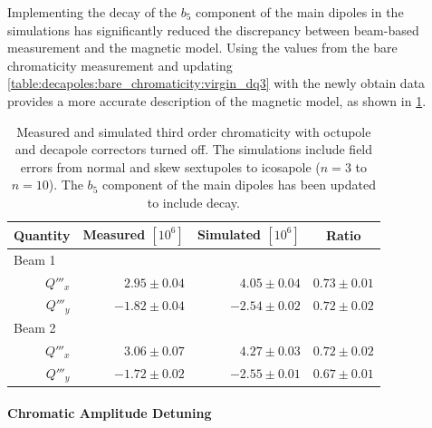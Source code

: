 Implementing the decay of the $b_5$ component of the main dipoles in the simulations has
significantly reduced the discrepancy between beam-based measurement and the magnetic model.
%
Using the values from the bare chromaticity measurement and updating
\cref{table:decapoles:bare_chromaticity:virgin_dq3} with the newly obtain data provides a more
accurate description of the magnetic model, as shown in
\cref{table:decapoles:decay:virgin_dq3_recompare}.


\begin{table}[!htb]
    \centering
    \begin{tabular}{rrrr}
      \toprule
      Quantity     &  Measured $[10^6]$        &  Simulated $[10^{6}]$          &   \multicolumn{1}{c}{Ratio}     \\
      \midrule
        \multicolumn{1}{l}{Beam 1}    &                             &                                &             \\
                $Q'''_x$ &       $ 2.95 \pm 0.04$      & $ 4.05 \pm 0.04$               &  $0.73 \pm 0.01$  \\
                $Q'''_y$ &       $-1.82 \pm 0.04$      & $-2.54 \pm 0.02$               &  $0.72 \pm 0.02$  \\
        \multicolumn{1}{l}{Beam 2}    &                             &                                &             \\
                $Q'''_x$ &       $ 3.06 \pm 0.07$      & $ 4.27 \pm 0.03$               &  $0.72 \pm 0.02$  \\
                $Q'''_y$ &       $-1.72 \pm 0.02$      & $-2.55 \pm 0.01$               &  $0.67 \pm 0.01$ \\
      \bottomrule
    \end{tabular}
    \caption{Measured and simulated third order chromaticity with octupole and decapole correctors
    turned off. The simulations include field errors from normal and skew sextupoles to icosapole
    ($n=3$ to $n=10$). The $b_5$ component of the main dipoles has been updated to include decay.}
    \label{table:decapoles:decay:virgin_dq3_recompare}
\end{table}




\paragraph{Chromatic Amplitude Detuning}

